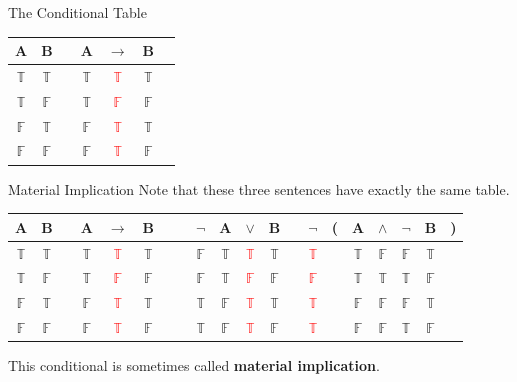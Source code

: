 \documentclass[
  ignorenonframetext,
]{beamer}
\renewcommand{\,}{\text{, }}
\def\True{\mathbb{T}}
\def\False{\mathbb{F}}
\begin{document}
\begin{frame}{The Conditional Table}
\protect\hypertarget{the-conditional-table}{}
\begin{center}
\begin{tabular}{@{ }c@{ }@{ }c | c@{ }@{ }c@{ }@{ }c@{ }@{ }c@{ }@{ }c}
A & B &  & A & $\rightarrow$ & B & \\
\hline 
$\True$ & $\True$ &  & $\True$ & \textcolor{red}{$\True$} & $\True$ & \\
$\True$ & $\False$ &  & $\True$ & \textcolor{red}{$\False$} & $\False$ & \\
$\False$ & $\True$ &  & $\False$ & \textcolor{red}{$\True$} & $\True$ & \\
$\False$ & $\False$ &  & $\False$ & \textcolor{red}{$\True$} & $\False$ & \\
\end{tabular}
\end{center}
\end{frame}

\begin{frame}{Material Implication}
\protect\hypertarget{material-implication}{}
Note that these three sentences have exactly the same table.

\begin{center}

\begin{tabular}{@{ }c@{ }@{ }c | c@{ }@{ }c@{ }@{ }c@{ }@{ }c@{ }@{ }c | c@{ }@{ }c@{ }@{ }c@{ }@{ }c@{ }@{ }c@{ }@{ }c | c@{ }@{}c@{}@{ }c@{ }@{ }c@{ }@{ }c@{ }@{ }c@{ }@{}c@{ }}
A & B &  & A & $\rightarrow$ & B &  &  & $\neg$ & A & $\vee$ & B &  & $\neg$ & ( & A & $\wedge$ & $\neg$ & B & )\\
\hline 
$\True$ & $\True$ &  & $\True$ & \textcolor{red}{$\True$} & $\True$ &  &  & $\False$ & $\True$ & \textcolor{red}{$\True$} & $\True$ &  & \textcolor{red}{$\True$} &  & $\True$ & $\False$ & $\False$ & $\True$ & \\
$\True$ & $\False$ &  & $\True$ & \textcolor{red}{$\False$} & $\False$ &  &  & $\False$ & $\True$ & \textcolor{red}{$\False$} & $\False$ &  & \textcolor{red}{$\False$} &  & $\True$ & $\True$ & $\True$ & $\False$ & \\
$\False$ & $\True$ &  & $\False$ & \textcolor{red}{$\True$} & $\True$ &  &  & $\True$ & $\False$ & \textcolor{red}{$\True$} & $\True$ &  & \textcolor{red}{$\True$} &  & $\False$ & $\False$ & $\False$ & $\True$ & \\
$\False$ & $\False$ &  & $\False$ & \textcolor{red}{$\True$} & $\False$ &  &  & $\True$ & $\False$ & \textcolor{red}{$\True$} & $\False$ &  & \textcolor{red}{$\True$} &  & $\False$ & $\False$ & $\True$ & $\False$ & \\
\end{tabular}

\end{center}

This conditional is sometimes called \textbf{material implication}.
\end{frame}
\end{document}
